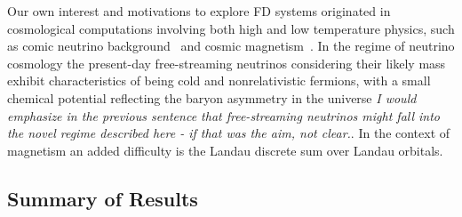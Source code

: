 \documentclass[sn-mathphys,Numbered]{sn-jnl}
\newcommand*{\xgreen}{\color{green}}
\begin{document}
Our own  interest and motivations to explore FD systems originated in  cosmological computations involving both high and low temperature physics, such as comic neutrino background~\cite{Birrell:2013gpa,Birrell:2012gg} and cosmic magnetism~\cite{Steinmetz:2023nsc}. In the regime of neutrino cosmology the present-day free-streaming neutrinos considering their likely mass exhibit characteristics of being cold and nonrelativistic fermions, with a small chemical potential reflecting the baryon asymmetry in the universe {\xgreen \it I would emphasize in the previous sentence that free-streaming neutrinos might fall into the novel regime described here - if that was the aim, not clear.}. In the context of magnetism an added difficulty is the Landau discrete sum over Landau orbitals. 

\subsection{Summary of Results}\label{Sresults}
\end{document}
